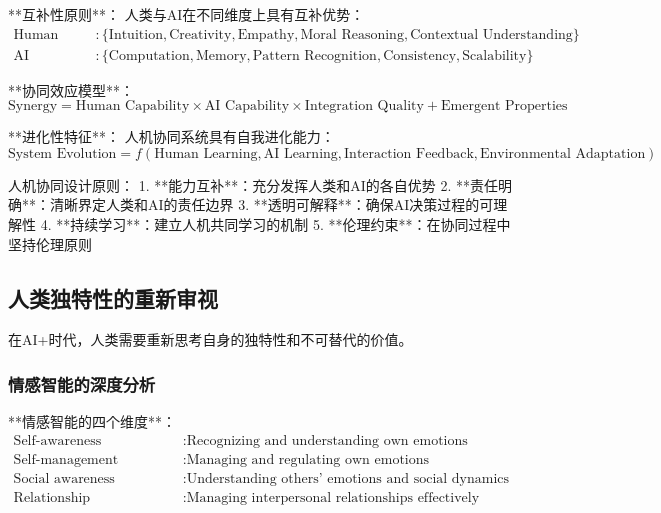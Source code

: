 **互补性原则**：
人类与AI在不同维度上具有互补优势：
\begin{align}
\text{Human Strengths} &: \{\text{Intuition}, \text{Creativity}, \text{Empathy}, \text{Moral Reasoning}, \text{Contextual Understanding}\} \\
\text{AI Strengths} &: \{\text{Computation}, \text{Memory}, \text{Pattern Recognition}, \text{Consistency}, \text{Scalability}\}
\end{align}

**协同效应模型**：
\begin{equation}
\text{Synergy} = \text{Human Capability} \times \text{AI Capability} \times \text{Integration Quality} + \text{Emergent Properties}
\end{equation}

**进化性特征**：
人机协同系统具有自我进化能力：
\begin{equation}
\text{System Evolution} = f(\text{Human Learning}, \text{AI Learning}, \text{Interaction Feedback}, \text{Environmental Adaptation})
\end{equation}

\begin{center}
人机协同设计原则：
1. **能力互补**：充分发挥人类和AI的各自优势
2. **责任明确**：清晰界定人类和AI的责任边界
3. **透明可解释**：确保AI决策过程的可理解性
4. **持续学习**：建立人机共同学习的机制
5. **伦理约束**：在协同过程中坚持伦理原则
\end{center}

\subsection{人类独特性的重新审视}

在AI+时代，人类需要重新思考自身的独特性和不可替代的价值。

\subsubsection{情感智能的深度分析} %

**情感智能的四个维度**：
\begin{align}
\text{Self-awareness} &: \text{Recognizing and understanding own emotions} \\
\text{Self-management} &: \text{Managing and regulating own emotions} \\
\text{Social awareness} &: \text{Understanding others' emotions and social dynamics} \\
\text{Relationship management} &: \text{Managing interpersonal relationships effectively}
\end{align}

